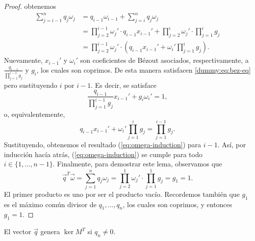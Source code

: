 \begin{proof}
	obtenemos
	\begin{align*}
		\sum_{j=i-1}^{n}q_j\omega_j
		&= q_{i-1}\omega_{i-1} + \sum_{j=i}^{n}q_j\omega_j \\
		&= \prod_{j=2}^{i-1}\omega_j' \cdot q_{i-1}x_{i-1}' + \prod_{j=2}^{i}\omega_j' \cdot
		\prod_{j=1}^{i}g_j \\
		&= \prod_{j=2}^{i-1}\omega_j' \cdot \left( q_{i-1}x_{i-1}' + \omega_i'
			\prod_{j=1}^{i}g_j \right).
	\end{align*}
	Nuevamente, $x_{i-1}'$ y $\omega_i'$ son coeficientes de Bézout asociados, respectivamente, a
	$\frac{q_{i-1}}{\prod_{j=1}^{i-1}g_j}$ y $g_i$, los cuales son coprimos. De esta manera
	satisfacen \eqref{dummy:eq:bez-eq} pero sustituyendo $i$ por $i - 1$. Es decir, se satisface
	\begin{equation*}
		\frac{q_{i-1}}{\prod_{j=1}^{i-1}g_j}x_{i-1}' +
		g_i \omega_i' = 1,
	\end{equation*}
	o, equivalentemente,
	\begin{equation*}
		q_{i-1}x_{i-1}' + \omega_i'\prod_{j=1}^{i}g_j = \prod_{j=1}^{i-1}g_j.
	\end{equation*}
	Sustituyendo, obtenemos el resultado (\ref{eq:omega-induction}) para $i - 1$. Así, por inducción
	hacía atrás, (\ref{eq:omega-induction}) se cumple para todo $i \in \lbrace 1, \ldots, n - 1
	\rbrace$. Finalmente, para demostrar este lema, observamos que
	\begin{equation*}
		\vec{q}^T\vec{\omega} = \sum_{j=1}^{n}q_j\omega_j = \prod_{j=2}^{1}\omega_j'
		\cdot \prod_{j=1}^{1}g_j = g_1 = 1.
	\end{equation*}
	El primer producto es uno por ser el producto vacío. Recordemos también que $g_1$ es el máximo
	común divisor de $q_1, \ldots, q_n$, los cuales son coprimos, y entonces $g_1 = 1$.
\end{proof}
\begin{lemma}
	\label{lemma:iso2}
	El vector $\vec{q}$ genera $\ker{M^T}$ si $q_n \neq 0$.
\end{lemma}
